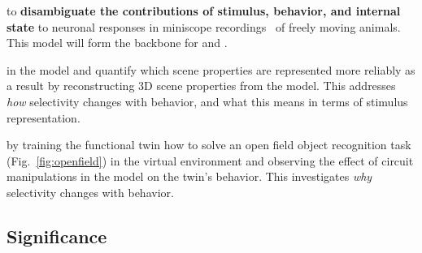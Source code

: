 \documentclass[COG,11pt]{ercgrant}
\begin{document}
 \textbf{\oonetitle} to \textbf{disambiguate the contributions of stimulus, behavior, and internal state} to neuronal responses in miniscope recordings~\parencite[see Fig.~\ref{fig:miniscope}]{Cai2016-rh} of freely moving animals. This model will form the backbone for  and .

 \textbf{\otwotitle} in the model and quantify which scene properties are represented more reliably as a result by reconstructing 3D scene properties from the model. This addresses \textit{how} selectivity changes with behavior, and what this means in terms of stimulus representation. 

 \textbf{\othreetitle} by training the functional twin how to solve an open field object recognition task (Fig.~\ref{fig:openfield}) in the virtual environment and observing the effect of circuit manipulations in the model on the twin's behavior. 
This investigates \textit{why} selectivity changes with behavior.


\subsection{Significance}
\end{document}
